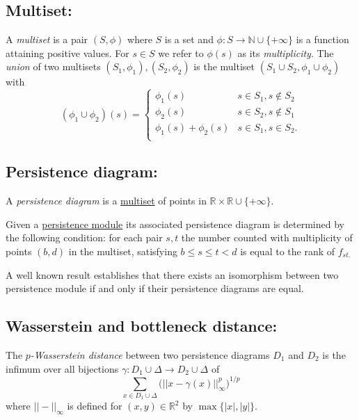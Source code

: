 \documentclass{amsart}
\begin{document}
	\subsection*{Multiset:} \label{multiset}
	
	A \textit{multiset} is a pair $(S, \phi)$ where $S$ is a set and  $\phi : S \to \mathbb N  \cup \{+\infty\}$ is a function attaining positive values. For $s \in S$ we refer to $\phi(s)$ as its \textit{multiplicity}. The \textit{union} of two multisets $(S_1, \phi_1), (S_2, \phi_2)$ is the multiset $(S_1 \cup S_2, \phi_1 \cup \phi_2)$ with
	\begin{equation*}
	(\phi_1 \cup \phi_2)(s) = 
	\begin{cases}
	\phi_1(s) & s \in S_1, s \not\in S_2 \\
	\phi_2(s) & s \in S_2, s \not\in S_1 \\
	\phi_1(s) + \phi_2(s) & s \in S_1, s \in S_2. \\
	\end{cases}
	\end{equation*}
	
	\subsection*{Persistence diagram:} \label{persistence diagram}
	
	A \textit{persistence diagram} is a \hyperref[multiset]{multiset} of points in $\mathbb R \times \mathbb{R} \cup \{+\infty\}$.
	
	Given a \hyperref[persistence module]{persistence module} its associated persistence diagram is determined by the following condition: for each pair $s,t$ the number counted with multiplicity of points $(b,d)$ in the multiset, satisfying $b \leq s \leq t < d$ is equal to the rank of $f_{st.}$
	
	A well known result establishes that there exists an isomorphism between two persistence module if and only if their persistence diagrams are equal.
	
	\subsection*{Wasserstein and bottleneck distance:}	\label{wasserstein and bottleneck distance}
	
	The \textit{$p$-Wasserstein distance} between two persistence diagrams $D_1$ and $D_2$ is the infimum over all bijections $\gamma: D_1 \cup \Delta \to D_2 \cup \Delta$ of
	\begin{equation*}
	\sum_{x \in D_1 \cup \Delta} \Big(||x - \gamma(x)||_\infty^p \Big)^{1/p}
	\end{equation*}
	where $||-||_\infty$ is defined for $(x,y) \in \mathbb R^2$ by $\max\{|x|, |y|\}$. 
	
\end{document}
